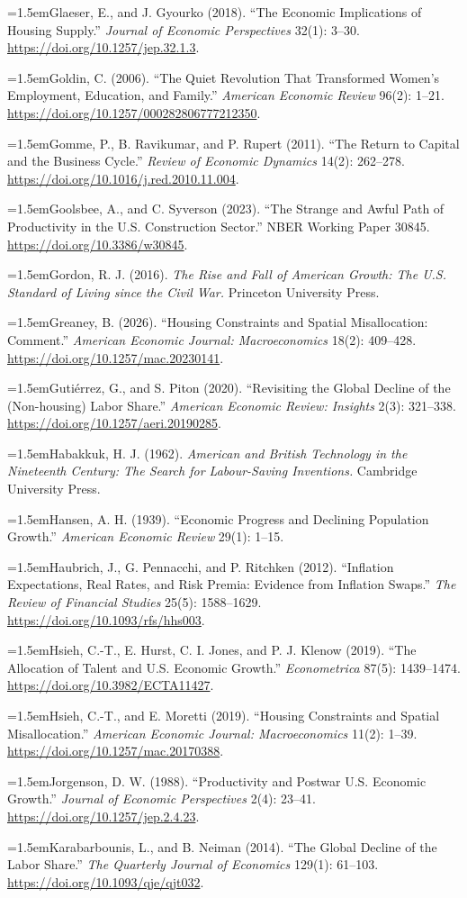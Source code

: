 \documentclass[12pt]{article}
\theoremstyle{plain}
\newcommand{\refentry}[1]{\par\hangindent=1.5em\hangafter=1\noindent #1}
\begin{document}
{\refentry{Glaeser, E., and J. Gyourko (2018). ``The Economic Implications of Housing Supply.'' \emph{Journal of Economic Perspectives} 32(1): 3--30. \url{https://doi.org/10.1257/jep.32.1.3}.}
\refentry{Goldin, C. (2006). ``The Quiet Revolution That Transformed Women's Employment, Education, and Family.'' \emph{American Economic Review} 96(2): 1--21. \url{https://doi.org/10.1257/000282806777212350}.}
\refentry{Gomme, P., B. Ravikumar, and P. Rupert (2011). ``The Return to Capital and the Business Cycle.'' \emph{Review of Economic Dynamics} 14(2): 262--278. \url{https://doi.org/10.1016/j.red.2010.11.004}.}
\refentry{Goolsbee, A., and C. Syverson (2023). ``The Strange and Awful Path of Productivity in the U.S. Construction Sector.'' NBER Working Paper 30845. \url{https://doi.org/10.3386/w30845}.}
\refentry{Gordon, R. J. (2016). \emph{The Rise and Fall of American Growth: The U.S. Standard of Living since the Civil War.} Princeton University Press.}
\refentry{Greaney, B. (2026). ``Housing Constraints and Spatial Misallocation: Comment.'' \emph{American Economic Journal: Macroeconomics} 18(2): 409--428. \url{https://doi.org/10.1257/mac.20230141}.}
\refentry{Guti\'errez, G., and S. Piton (2020). ``Revisiting the Global Decline of the (Non-housing) Labor Share.'' \emph{American Economic Review: Insights} 2(3): 321--338. \url{https://doi.org/10.1257/aeri.20190285}.}
\refentry{Habakkuk, H. J. (1962). \emph{American and British Technology in the Nineteenth Century: The Search for Labour-Saving Inventions.} Cambridge University Press.}
\refentry{Hansen, A. H. (1939). ``Economic Progress and Declining Population Growth.'' \emph{American Economic Review} 29(1): 1--15.}
\refentry{Haubrich, J., G. Pennacchi, and P. Ritchken (2012). ``Inflation Expectations, Real Rates, and Risk Premia: Evidence from Inflation Swaps.'' \emph{The Review of Financial Studies} 25(5): 1588--1629. \url{https://doi.org/10.1093/rfs/hhs003}.}
\refentry{Hsieh, C.-T., E. Hurst, C. I. Jones, and P. J. Klenow (2019). ``The Allocation of Talent and U.S. Economic Growth.'' \emph{Econometrica} 87(5): 1439--1474. \url{https://doi.org/10.3982/ECTA11427}.}
\refentry{Hsieh, C.-T., and E. Moretti (2019). ``Housing Constraints and Spatial Misallocation.'' \emph{American Economic Journal: Macroeconomics} 11(2): 1--39. \url{https://doi.org/10.1257/mac.20170388}.}
\refentry{Jorgenson, D. W. (1988). ``Productivity and Postwar U.S. Economic Growth.'' \emph{Journal of Economic Perspectives} 2(4): 23--41. \url{https://doi.org/10.1257/jep.2.4.23}.}
\refentry{Karabarbounis, L., and B. Neiman (2014). ``The Global Decline of the Labor Share.'' \emph{The Quarterly Journal of Economics} 129(1): 61--103. \url{https://doi.org/10.1093/qje/qjt032}.}
}
\end{document}

